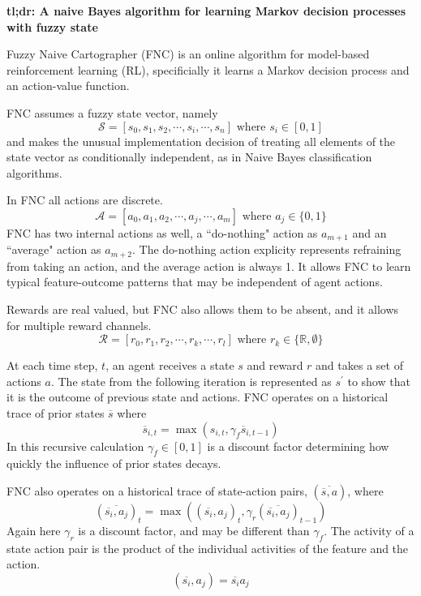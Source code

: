 \label{sec:intro}

\textbf{tl;dr: A naive Bayes algorithm for learning Markov decision processes
with fuzzy state}

Fuzzy Naive Cartographer (FNC) is an online algorithm for
model-based reinforcement learning (RL), specificially it learns 
a Markov decision process and an action-value function.

FNC assumes a fuzzy state vector, namely
\begin{equation}
\mathcal{S} = [s_0, s_1, s_2, \cdots, s_i, \cdots, s_n] \mbox{ where } s_i \in [0, 1] 
\end{equation}
and makes the unusual implementation decision of
treating all elements of the state vector as conditionally independent, as in
Naive Bayes classification algorithms.

In FNC all actions are discrete.
\begin{equation}
\mathcal{A} = [a_0, a_1, a_2, \cdots, a_j, \cdots, a_m] \mbox{ where } a_j \in \{0, 1\} 
\end{equation}
FNC has two internal actions as well, a ``do-nothing" action as $a_{m+1}$ and
an ``average" action as $a_{m+2}$. The do-nothing action explicity represents 
refraining from taking an action, and the average action is always 1. It
allows FNC to learn typical feature-outcome patterns that may be independent
of agent actions.

Rewards are real valued, but FNC also allows them to be absent, and it
allows for multiple reward channels. 
\begin{equation}
\mathcal{R} = [r_0, r_1, r_2, \cdots, r_k, \cdots, r_l] \mbox{ where } r_k \in \{\mathbb{R}, \emptyset\}
\end{equation}

At each time step, $t$, an agent receives a state $s$ and reward $r$
and takes a set of actions $a$. The state from the following iteration is
represented as $s^{\prime}$ to show that it is the
outcome of previous state and actions.
FNC operates on a historical trace of prior states $\overline{s}$ where
\begin{equation}
\overline{s}_{i, t} = \max(s_{i, t}, \gamma_f \overline{s}_{i, t-1})
\end{equation}
In this recursive calculation $\gamma_f \in [0, 1]$ is a discount factor determining
how quickly the influence of prior states decays.

FNC also operates on a historical trace of state-action pairs,
$(\overline{\overline{s}, a})$, where
\begin{equation}
(\overline{\overline{s_i}, a_j})_t = \max(
(\overline{s_i}, a_j)_t , 
\gamma_r (\overline{\overline{s_i}, a_j})_{t-1})
\end{equation}
Again here $\gamma_r$ is a discount factor, and may be different than
$\gamma_f$. The activity of a state action pair is the product of the
individual activities of the feature and the action.
\begin{equation}
(\overline{s_i}, a_j) = \overline{s_i} a_j
\end{equation}

